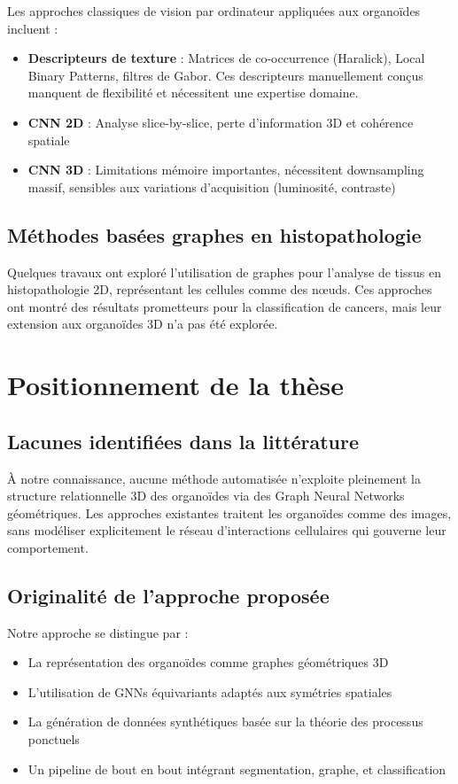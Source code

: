 Les approches classiques de vision par ordinateur appliquées aux organoïdes incluent :
\begin{itemize}
    \item \textbf{Descripteurs de texture} : Matrices de co-occurrence (Haralick), Local Binary Patterns, filtres de Gabor. Ces descripteurs manuellement conçus manquent de flexibilité et nécessitent une expertise domaine.
    \item \textbf{CNN 2D} : Analyse slice-by-slice, perte d'information 3D et cohérence spatiale
    \item \textbf{CNN 3D} : Limitations mémoire importantes, nécessitent downsampling massif, sensibles aux variations d'acquisition (luminosité, contraste)
\end{itemize}

\subsection{Méthodes basées graphes en histopathologie}

Quelques travaux ont exploré l'utilisation de graphes pour l'analyse de tissus en histopathologie 2D, représentant les cellules comme des nœuds. Ces approches ont montré des résultats prometteurs pour la classification de cancers, mais leur extension aux organoïdes 3D n'a pas été explorée.

\section{Positionnement de la thèse}

\subsection{Lacunes identifiées dans la littérature}

À notre connaissance, aucune méthode automatisée n'exploite pleinement la structure relationnelle 3D des organoïdes via des Graph Neural Networks géométriques. Les approches existantes traitent les organoïdes comme des images, sans modéliser explicitement le réseau d'interactions cellulaires qui gouverne leur comportement.

\subsection{Originalité de l'approche proposée}

Notre approche se distingue par :
\begin{itemize}
    \item La représentation des organoïdes comme graphes géométriques 3D
    \item L'utilisation de GNNs équivariants adaptés aux symétries spatiales
    \item La génération de données synthétiques basée sur la théorie des processus ponctuels
    \item Un pipeline de bout en bout intégrant segmentation, graphe, et classification
\end{itemize}

